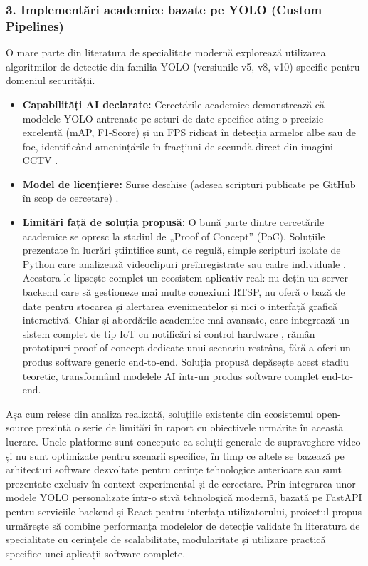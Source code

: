 \documentclass[../../main.tex]{subfiles}
\begin{document}
\subsubsection*{3. Implementări academice bazate pe YOLO (Custom Pipelines)}
O mare parte din literatura de specialitate modernă explorează utilizarea algoritmilor de detecție din familia YOLO (versiunile v5, v8, v10) specific pentru domeniul securității.
\begin{itemize}
	\item \textbf{Capabilități AI declarate:} Cercetările academice demonstrează că modelele YOLO antrenate pe seturi de date specifice ating o precizie excelentă (mAP, F1-Score) și un FPS ridicat în detecția armelor albe sau de foc, identificând amenințările în fracțiuni de secundă direct din imagini CCTV \cite{fierro2026,mandal2026}.
	\item \textbf{Model de licențiere:} Surse deschise (adesea scripturi publicate pe \linebreak GitHub în scop de cercetare) \cite{mandal2026}.
	\item \textbf{Limitări față de soluția propusă:} O bună parte dintre cercetările academice se opresc la stadiul de „Proof of Concept” (PoC). Soluțiile prezentate în lucrări științifice sunt, de regulă, simple scripturi izolate de Python care analizează videoclipuri preînregistrate sau cadre individuale \cite{fierro2026,mandal2026}. Acestora le lipsește complet un ecosistem aplicativ real: nu dețin un server backend care să gestioneze mai multe conexiuni RTSP, nu oferă o bază de date pentru stocarea și alertarea evenimentelor și nici o interfață grafică interactivă. Chiar și abordările academice mai avansate, care integrează un sistem complet de tip IoT cu notificări și control hardware \cite{khan2026}, rămân prototipuri proof-of-concept dedicate unui scenariu restrâns, fără a oferi un produs software generic end-to-end. Soluția propusă depășește acest stadiu teoretic, transformând modelele AI într-un produs software complet end-to-end.
\end{itemize}

Așa cum reiese din analiza realizată, soluțiile existente din ecosistemul open-source prezintă o serie de limitări în raport cu obiectivele urmărite în această lucrare. Unele platforme sunt concepute ca soluții generale de supraveghere video și nu sunt optimizate pentru scenarii specifice, în timp ce altele se bazează pe arhitecturi software dezvoltate pentru cerințe tehnologice anterioare sau sunt prezentate exclusiv în context experimental și de cercetare. Prin integrarea unor modele YOLO personalizate într-o stivă tehnologică modernă, bazată pe \linebreak FastAPI pentru serviciile backend și React pentru interfața utilizatorului, proiectul propus urmărește să combine performanța modelelor de detecție validate în literatura de specialitate cu cerințele de scalabilitate, modularitate și utilizare practică specifice unei aplicații software complete.
\end{document}
